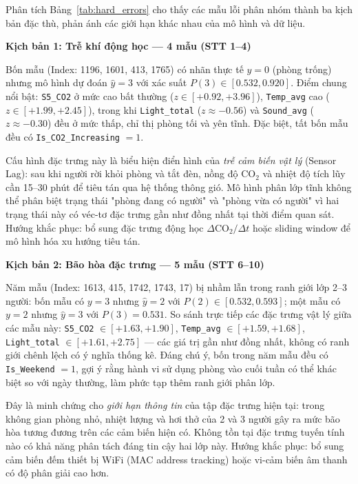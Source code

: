 Phân tích Bảng~\ref{tab:hard_errors} cho thấy các mẫu lỗi phân nhóm 
thành ba kịch bản đặc thù, phản ánh các giới hạn khác nhau của mô 
hình và dữ liệu.

\textbf{Kịch bản 1: Trễ khí động học --- 
4 mẫu (STT 1--4)}

Bốn mẫu (Index: 1196, 1601, 413, 1765) có nhãn thực tế $y = 0$ 
(phòng trống) nhưng mô hình dự đoán $\hat{y} = 3$ với xác suất 
$P(3) \in [0.532, 0.920]$. Điểm chung nổi bật: \texttt{S5\_CO2} 
ở mức cao bất thường ($z \in [+0.92, +3.96]$), \texttt{Temp\_avg} 
cao ($z \in [+1.99, +2.45]$), trong khi \texttt{Light\_total} 
($z \approx -0.56$) và \texttt{Sound\_avg} ($z \approx -0.30$) 
đều ở mức thấp, chỉ thị phòng tối và yên tĩnh. Đặc biệt, tất bốn 
mẫu đều có \texttt{Is\_CO2\_Increasing} $= 1$.

Cấu hình đặc trưng này là biểu hiện điển hình của \textit{trễ cảm 
biến vật lý} (Sensor Lag): sau khi người rời khỏi phòng và tắt đèn, 
nồng độ $\mathrm{CO}_2$ và nhiệt độ tích lũy cần 15--30 phút để 
tiêu tán qua hệ thống thông gió. Mô hình phân lớp tĩnh không thể 
phân biệt trạng thái "phòng đang có người" và "phòng vừa có người" 
vì hai trạng thái này có véc-tơ đặc trưng gần như đồng nhất tại 
thời điểm quan sát. Hướng khắc phục: bổ sung đặc trưng động học 
$\Delta\mathrm{CO}_2 / \Delta t$ hoặc sliding window
để mô hình hóa xu hướng tiêu tán.

\textbf{Kịch bản 2: Bão hòa đặc trưng --- 
5 mẫu (STT 6--10)}

Năm mẫu (Index: 1613, 415, 1742, 1743, 17) bị nhầm lẫn trong ranh 
giới lớp 2--3 người: bốn mẫu có $y = 3$ nhưng $\hat{y} = 2$ với 
$P(2) \in [0.532, 0.593]$; một mẫu có $y = 2$ nhưng $\hat{y} = 3$ 
với $P(3) = 0.531$. So sánh trực tiếp các đặc trưng vật lý giữa 
các mẫu này: \texttt{S5\_CO2} $\in [+1.63, +1.90]$, 
\texttt{Temp\_avg} $\in [+1.59, +1.68]$, \texttt{Light\_total} 
$\in [+1.61, +2.75]$ --- các giá trị gần như đồng nhất, không có 
ranh giới chênh lệch có ý nghĩa thống kê. Đáng chú ý, bốn trong 
năm mẫu đều có \texttt{Is\_Weekend} $= 1$, gợi ý rằng hành vi sử 
dụng phòng vào cuối tuần có thể khác biệt so với ngày thường, làm 
phức tạp thêm ranh giới phân lớp.

Đây là minh chứng cho \textit{giới hạn thông tin} của tập đặc trưng hiện tại: trong không gian phòng nhỏ, 
nhiệt lượng và hơi thở của 2 và 3 người gây ra mức bão hòa tương 
đương trên các cảm biến hiện có. Không tồn tại đặc trưng tuyến tính 
nào có khả năng phân tách đáng tin cậy hai lớp này. Hướng khắc 
phục: bổ sung cảm biến đếm thiết bị WiFi (MAC address tracking) 
hoặc vi-cảm biến âm thanh có độ phân giải cao hơn.

